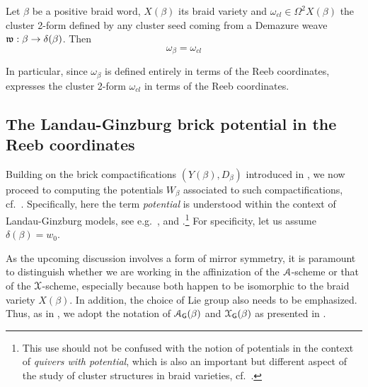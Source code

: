 \begin{proposition}\label{prop:2forms}
Let $\beta$ be a positive braid word, $X(\beta)$ its braid variety and $\omega_{cl}\in\Omega^2 X(\beta)$ the cluster 2-form defined by any cluster seed coming from a Demazure weave $\mathfrak{w}:\beta\to\delta(\beta)$. Then
\begin{equation}\label{eq:equality_2_forms}
\boxed{\omega_\beta=\omega_{cl}}
\end{equation}
\sbs
\end{proposition}

\noindent In particular, since $\omega_\beta$ is defined entirely in terms of the Reeb coordinates,  expresses the cluster 2-form $\omega_{cl}$ in terms of the Reeb coordinates.


\subsection{The Landau-Ginzburg brick potential in the Reeb coordinates}\label{thm:superpotential_Reeb_coordinates} Building on the brick compactifications $(Y(\beta),D_\beta)$ introduced in , we now proceed to computing the potentials $W_\beta$ associated to such compactifications, cf.~. Specifically, here the term {\it potential} is understood within the context of Landau-Ginzburg models, see e.g.~\cite[Sections 3\& 11]{GoncharovShen15}, \cite[Sections 3\&4]{GS19} and \cite[Section 0.4]{GHKK18}.\footnote{This use should not be confused with the notion of potentials in the context of {\it quivers with potential}, which is also an important but different aspect of the study of cluster structures in braid varieties, cf.~\cite{CasalsGao24}.} For specificity, let us assume $\delta(\beta)=w_0$.

\begin{remark} As the upcoming discussion involves a form of mirror symmetry, it is paramount to distinguish whether we are working in the affinization of the $\mathcal{A}$-scheme or that of the $\mathcal{X}$-scheme, especially because both happen to be isomorphic to the braid variety $X(\beta)$. In addition, the choice of Lie group also needs to be emphasized. Thus, as in , we adopt the notation of $\mathcal{A}_{\mathsf{G}}(\beta)$ and $\mathcal{X}_{\mathsf{G}}(\beta)$ as presented in .\sbs
\end{remark}

